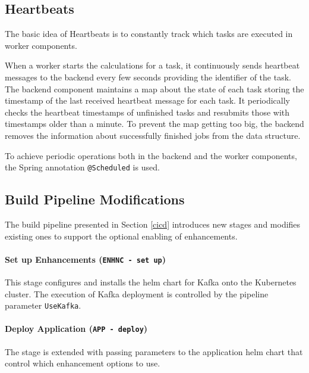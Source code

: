 \subsection{Heartbeats}


The basic idea of Heartbeats is to constantly track which tasks are executed in worker components.

When a worker starts the calculations for a task, it continuously sends heartbeat messages to the backend every few seconds providing the identifier of the task. The backend component maintains a map about the state of each task storing the timestamp of the last received heartbeat message for each task. It periodically checks the heartbeat timestamps of unfinished tasks and resubmits those with timestamps older than a minute. To prevent the map getting too big, the backend removes the information about successfully finished jobs from the data structure.

To achieve periodic operations both in the backend and the worker components, the Spring annotation \texttt{@Scheduled} is used.


\subsection{Build Pipeline Modifications} \label{cicd-modifications}

The build pipeline presented in Section \ref{cicd} introduces new stages and modifies existing ones to support the optional enabling of enhancements.

\paragraph{Set up Enhancements (\texttt{ENHNC - set up})} This stage configures and installs the helm chart for Kafka onto the Kubernetes cluster. The execution of Kafka deployment is controlled by the pipeline parameter \texttt{UseKafka}.

\paragraph{Deploy Application (\texttt{APP - deploy})} The stage is extended with passing parameters to the application helm chart that control which enhancement options to use.




